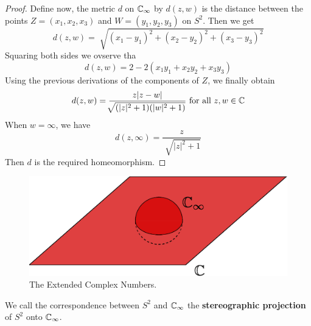 \begin{proof}
    Define now, the metric $d$ on  $\mathbb{C}_\infty$ by  $d(z,w)$ is the distance
    between the points $Z=(x_1,x_2,x_3)$ and $W=(y_1,y_2,y_3)$ on $S^2$. Then we
    get
    \begin{equation*}
        d(z,w)=\sqrt[]{(x_1-y_1)^2+(x_2-y_2)^2+(x_3-y_3)^2}
    \end{equation*}
    Squaring both sides we ovserve tha
    \begin{equation*}
        d(z,w)=2-2(x_1y_1+x_2y_2+x_3y_3)
    \end{equation*}
    Using the previous derivations of the components of $Z$, we finally obtain
    \begin{equation*}
        d(z,w)=\frac{z|z-w|}{\sqrt[]{(|z|^2+1)(|w|^2+1)}} \text{ for all }
        z,w \in \mathbb{C}
    \end{equation*}
    When $w=\infty$, we have
    \begin{equation*}
        d(z,\infty)=\frac{z}{\sqrt[]{|z|^2+1}}
    \end{equation*}
    Then $d$ is the required homeomorphism.
\end{proof}

\begin{figure}[h]
    \centering
    \includegraphics[scale=0.5]{Figures/Chapter1/extended_complex_numbers.eps}
    \caption{The Extended Complex Numbers.}
    \label{fig_1.2}
\end{figure}

\begin{definition}
    We call the correspondence between $S^2$ and  $\mathbb{C}_\infty$ the
    \textbf{stereographic projection} of $S^2$ onto $\mathbb{C}_\infty$.
\end{definition}
